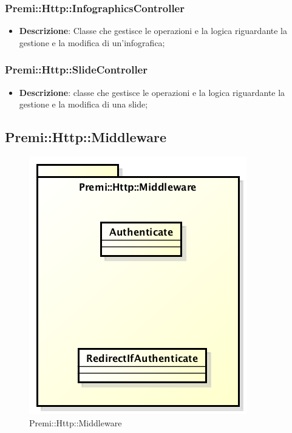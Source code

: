 	\subsubsection*{Premi::Http::InfographicsController}
			\begin{itemize}
				\item \textbf{Descrizione}: Classe che gestisce le operazioni e la logica riguardante la gestione e la modifica di un'\gls{infografica};
			\end{itemize}
			
	\subsubsection*{Premi::Http::SlideController}
			\begin{itemize}
				\item \textbf{Descrizione}: classe che gestisce le operazioni e la logica riguardante la gestione e la modifica di una \gls{slide};
			\end{itemize}
		
\newpage
\subsection{Premi::Http::Middleware}
\begin{figure}[h]
\centering
\includegraphics[width=0.7\linewidth]{img/premi_http_middleware}
\caption[Premi::Http::Middleware]{Premi::Http::Middleware}
\label{fig:premi_http_middleware}
\end{figure}

